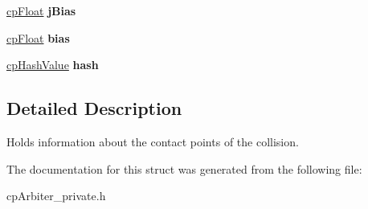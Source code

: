 \begin{DoxyCompactItemize}
\item 
\hypertarget{structcp_contact_a0a626c4ba591d693e88eceb737b22d80}{}\hyperlink{group__basic_types_gac1ed65573e035bf892505768c852d8d3}{cp\+Float} {\bfseries j\+Bias}\label{structcp_contact_a0a626c4ba591d693e88eceb737b22d80}

\item 
\hypertarget{structcp_contact_ae7f4f699739f54df581effb936ffe766}{}\hyperlink{group__basic_types_gac1ed65573e035bf892505768c852d8d3}{cp\+Float} {\bfseries bias}\label{structcp_contact_ae7f4f699739f54df581effb936ffe766}

\item 
\hypertarget{structcp_contact_a1ecf53c870da47cdedfb9340b774ee08}{}\hyperlink{group__basic_types_gae7eb4775a9f43914a15553ca65a048f4}{cp\+Hash\+Value} {\bfseries hash}\label{structcp_contact_a1ecf53c870da47cdedfb9340b774ee08}

\end{DoxyCompactItemize}


\subsection{Detailed Description}
Holds information about the contact points of the collision. 

The documentation for this struct was generated from the following file\+:\begin{DoxyCompactItemize}
\item 
cp\+Arbiter\+\_\+private.\+h\end{DoxyCompactItemize}

